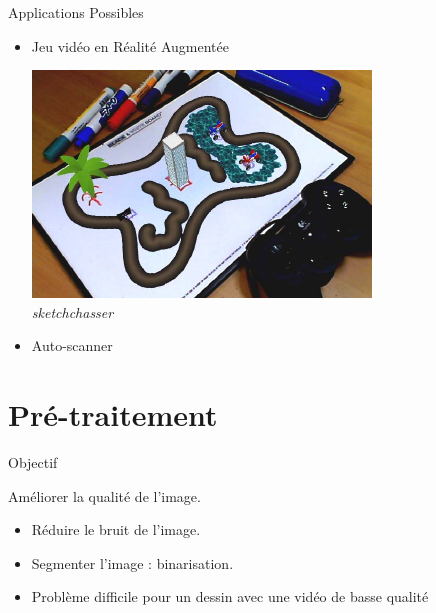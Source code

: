 \documentclass[t,14pt]{beamer}
\begin{document}
\begin{frame}{Applications Possibles}
\vspace{2mm}
\begin{itemize}
\item Jeu vidéo en Réalité Augmentée

\begin{center}
\includegraphics[scale=0.5]{images/sketchchasser.png}
\textit{\\sketchchasser}
\end{center}
\item Auto-scanner 
\end{itemize}
\end{frame}

\section[Pré-traitement]{Pré-traitement}
\begin{frame}{Objectif}
\vspace{5mm}
\begin{block}{}
Améliorer la qualité de l'image.
\end{block}
\begin{itemize}[<+->]
\item Réduire le bruit de l'image.
\item Segmenter l'image : binarisation.



\item Problème difficile pour un dessin avec une vidéo de basse qualité 





\end{itemize}
\end{frame}
\end{document}
